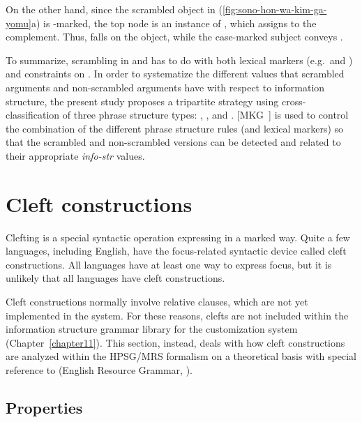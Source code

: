 \noindent On the other hand, since the scrambled object in
(\ref{fig:sono-hon-wa-kim-ga-yomu}a) is {\wa}-marked, the top node is
an instance of , which assigns
 to the complement. Thus,  falls on the
object, while the case-marked subject conveys .


To summarize, scrambling in
 and  has to do with both lexical markers
(e.g.\ \wa and \nun) and constraints on
. In order to systematize the
different values that scrambled arguments and non-scrambled arguments
have with respect to information structure, the present study proposes
a tripartite strategy using cross-classification of three phrase
structure types: , , and
. \mbox{[MKG ]} is used to control
the combination of the different phrase structure rules (and lexical
markers) so that the scrambled and non-scrambled versions can be
detected and related to their appropriate \textit{info-str}
values.



\section{Cleft constructions}
\label{10:sec:clefts}


Clefting is a special syntactic operation expressing  in a marked
way. Quite a few languages, including English, have the
focus-related syntactic device called cleft constructions.  All
languages have at least one way to express focus, but it is unlikely
that all languages have cleft constructions.


Cleft constructions normally involve relative clauses, which are not yet implemented in the \lingo {} system.  For these reasons, clefts are not included within
the information structure grammar library for the customization system
(Chapter~\ref{chapter11}).  This section, instead, deals with how
cleft constructions are analyzed within the HPSG/MRS formalism on a
theoretical basis with special reference to  (English Resource
Grammar, \citealt{flickinger:00}).



\subsection{Properties}
\label{10:sssec:clefts:properties}




